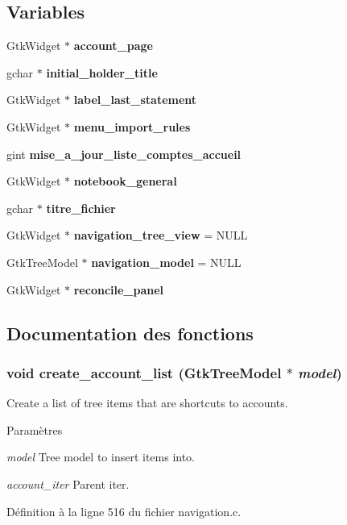 \subsection*{Variables}
\begin{DoxyCompactItemize}
\item 
GtkWidget $\ast$ {\bf account\_\-page}
\item 
gchar $\ast$ {\bf initial\_\-holder\_\-title}
\item 
GtkWidget $\ast$ {\bf label\_\-last\_\-statement}
\item 
GtkWidget $\ast$ {\bf menu\_\-import\_\-rules}
\item 
gint {\bf mise\_\-a\_\-jour\_\-liste\_\-comptes\_\-accueil}
\item 
GtkWidget $\ast$ {\bf notebook\_\-general}
\item 
gchar $\ast$ {\bf titre\_\-fichier}
\item 
GtkWidget $\ast$ {\bf navigation\_\-tree\_\-view} = NULL
\item 
GtkTreeModel $\ast$ {\bf navigation\_\-model} = NULL
\item 
GtkWidget $\ast$ {\bf reconcile\_\-panel}
\end{DoxyCompactItemize}


\subsection{Documentation des fonctions}
\subsubsection[{create\_\-account\_\-list}]{\setlength{\rightskip}{0pt plus 5cm}void create\_\-account\_\-list (GtkTreeModel $\ast$ {\em model})}\label{navigation_8c_a40d9073dbe6df6658ce1c5c45118cd22}
Create a list of tree items that are shortcuts to accounts.


\begin{DoxyParams}{Paramètres}
\item[{\em model}]Tree model to insert items into. \item[{\em account\_\-iter}]Parent iter. \end{DoxyParams}


Définition à la ligne 516 du fichier navigation.c.

